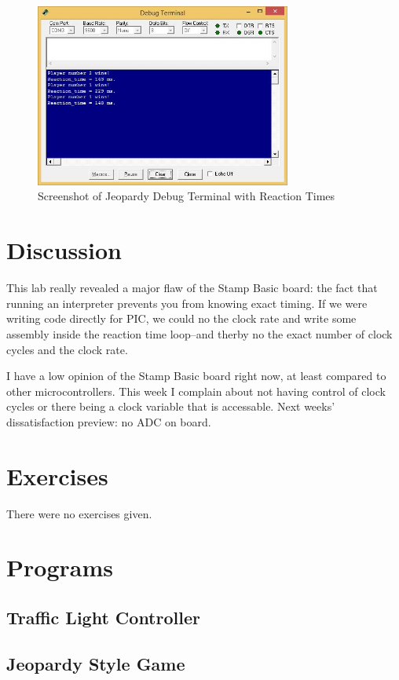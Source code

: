 \documentclass[11pt]{article}
\begin{document}
\begin{figure}
\centering
\includegraphics[width=0.75\textwidth]{jeopardy-screenshot.jpg}
\caption{Screenshot of Jeopardy Debug Terminal with Reaction Times}
\label{jeopardy-debug}
\end{figure}

\section{Discussion}

This lab really revealed a major flaw of the Stamp Basic board:
the fact that running an interpreter prevents you from knowing exact timing.
If we were writing code directly for PIC, we could no the clock rate and write some
assembly inside the reaction time loop--and therby no the exact number of clock cycles
and the clock rate.

I have a low opinion of the Stamp Basic board right now, at least compared to other
microcontrollers. This week I complain about not having control of clock cycles or there being
a clock variable that is accessable. Next weeks' dissatisfaction preview: no ADC on board.

\section{Exercises}

There were no exercises given.

\clearpage
\section{Programs}

\subsection{Traffic Light Controller}
\begingroup
\fontsize{10pt}{12pt}



\endgroup

\clearpage
\subsection{Jeopardy Style Game}
\begingroup
\fontsize{9pt}{11pt}



\endgroup
\end{document}
